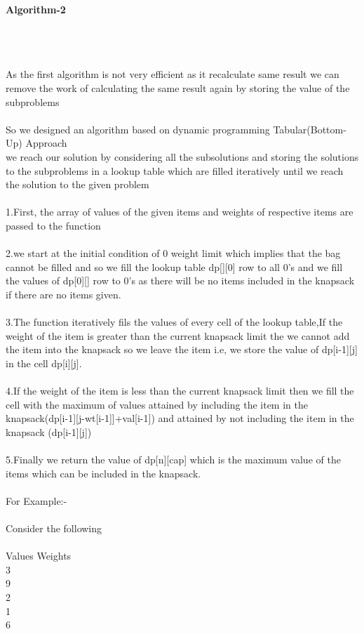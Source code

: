 \documentclass[twocolumn]{article}
\begin{document}
\centerline{\textbf{Algorithm-2}}\\
\\
\noindent\\
As the first algorithm is not very efficient as it recalculate same result we can remove the work of calculating the same result again by storing the value of the subproblems\\
\\
So we designed an algorithm  based on dynamic programming Tabular(Bottom-Up) Approach
\noindent\\
we reach our solution by considering all the subsolutions and storing the solutions to the subproblems in a lookup table which are filled iteratively until we reach the solution to the given problem  \\
\noindent\\
1.First, the array of values of the given items and weights of respective items are passed to the function \\
\noindent\\
2.we start at the initial condition of 0 weight limit which implies that the bag cannot be filled and so we fill the lookup table dp[][0] row to all 0’s and we fill the values of dp[0][] row to 0’s as there will be no  items included in the knapsack if there are no items given.\\
\noindent\\
3.The function iteratively fils the values of every cell of the lookup table,If the weight of the item is greater than the current knapsack limit the we cannot add the item into the knapsack so we leave the item i.e, we store the value of dp[i-1][j] in the cell dp[i][j].\\
\noindent\\
4.If the weight of the item is less than the current knapsack limit then we fill the cell with the maximum of  values attained by including the item in the knapsack(dp[i-1][j-wt[i-1]]+val[i-1]) and attained by not including the item in the knapsack (dp[i-1][j])\\
\noindent\\
5.Finally we return the value of dp[n][cap] which is the maximum value of the items which can be included in the knapsack.\\
\noindent\\
For Example:-\\
\\
Consider the following\\
\\
Values  Weights\\
3\space \space \space \space \space \space \space {}\\
9\space \space \space \space \space \space \space {}\\
2\space \space \space \space \space \space \space {}\\
1\space \space \space \space \space \space \space {}\\
6\space \space \space \space \space \space \space {}	\\
\end{document}
